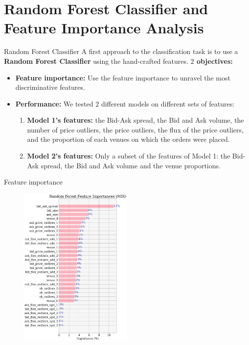 \documentclass{beamer}
\begin{document}
\section{Random Forest Classifier and Feature Importance Analysis}
\begin{frame}{Random Forest Classifier}
    A first approach to the classification task is to use a \textbf{Random Forest Classifier} using the hand-crafted features.
    \newline\newline
    \textbf{$2$ objectives:}
    \begin{itemize}
        \item \textbf{Feature importance:} Use the feature importance to unravel the most discriminative features.
        \item \textbf{Performance:} We tested $2$ different models on different sets of features:
              \begin{enumerate}
                  \item \textbf{Model 1's features:} the Bid-Ask spread, the Bid and Ask volume, the number of price outliers, the price outliers, the flux of the price outliers, and the proportion of each venues on which the orders were placed.
                  \item \textbf{Model 2's features:} Only a subset of the features of Model 1: the Bid-Ask spread, the Bid and Ask volume and the venue proportions.
              \end{enumerate}
    \end{itemize}
\end{frame}
\begin{frame}{Feature importance}
    \begin{figure}[H]
        \centering
        \includegraphics[width=0.5\textwidth]{figures/feature_importance.png}
    \end{figure}
\end{frame}
\end{document}
